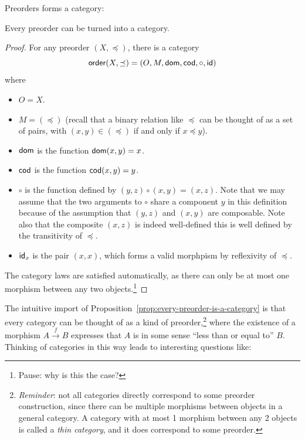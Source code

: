 Preorders forms a category:
\begin{construction} \label{prop:every-preorder-is-a-category}
  Every preorder can be turned into a category.
  \label{eq:const-preorder}
\end{construction}
\begin{proof}
  For any preorder \((X,\preceq)\), there is a category
  \[
    \mathsf{order}(X,\preceq) = (O,M,\operatorname{\mathsf{dom}},\operatorname{\mathsf{cod}},\circ,\mathsf{id})
  \]
  where
  \begin{itemize}
    \item \(O = X\).
    \item \(M = (\preceq)\) (recall that a binary relation like \(\preceq\)
      can be thought of as a set of pairs, with \((x,y) \in (\preceq)\)
      if and only if \(x\preceq y\)).
    \item \(\operatorname{\mathsf{dom}}\) is the function \(\operatorname{\mathsf{dom}}(x,y) = x\).
    \item \(\operatorname{\mathsf{cod}}\) is the function \(\operatorname{\mathsf{cod}}(x,y) = y\).
    \item \(\circ\) is the function defined by \((y,z)\circ(x,y) = (x,z)\).
      Note that we may assume that the two arguments to \(\circ\)
      share a component \(y\) in this definition because of the assumption
      that \((y,z)\) and \((x,y)\) are composable.
      Note also that the composite \((x,z)\) is indeed well-defined
      this is well defined by the transitivity of \(\preceq\).
    \item \(\mathsf{id}_x\) is the pair \((x,x)\), which forms a valid morphpism
      by reflexivity of \(\preceq\).
  \end{itemize}
  The category laws are satisfied automatically,
  as there can only be at most one morphism between any two objects.\footnote{Pause: 
  why is this the case?}
\end{proof}
\noindent
The intuitive import of Proposition~\ref{prop:every-preorder-is-a-category}
is that every category can be thought of as a kind of preorder,\footnote{\emph{Reminder}: not all 
categories directly correspond to some preorder construction, since there can be multiple 
morphisms between objects in a general category. A category with at most 1 morphism between 
any 2 objects is called a \emph{thin category}, and it does correspond to some preorder.}
where the existence of a morphism \(A\xrightarrow{f} B\)
expresses that \(A\) is in some sense ``less than or equal to'' \(B\).
Thinking of categories in this way leads to interesting questions like:
